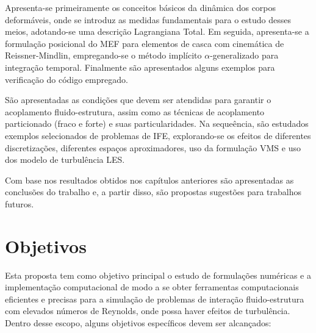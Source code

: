 {         Apresenta-se primeiramente os conceitos básicos da dinâmica dos corpos deformáveis, onde se introduz as medidas fundamentais para o estudo desses meios, adotando-se uma descrição Lagrangiana Total. Em seguida, apresenta-se a formulação posicional do MEF para elementos de casca com cinemática de Reissner-Mindlin, empregando-se o método implícito $\alpha$-generalizado para integração temporal. Finalmente são apresentados alguns exemplos para verificação do código empregado.


         São apresentadas as condições que devem ser atendidas para garantir o acoplamento fluido-estrutura, assim como as técnicas de acoplamento particionado (fraco e forte) e suas particularidades. Na sequeência, são estudados exemplos selecionados de problemas de IFE, explorando-se os efeitos de diferentes discretizações, diferentes espaços aproximadores, uso da formulação VMS e uso dos modelo de turbulência LES.

         Com base nos resultados obtidos nos capítulos anteriores são apresentadas as conclusões do trabalho e, a partir disso, são propostas sugestões para trabalhos futuros.
    }




\section{Objetivos}

Esta proposta tem como objetivo principal o estudo de formulações numéricas e a implementação computacional de modo a se obter ferramentas computacionais eficientes e precisas para a simulação de problemas de interação fluido-estrutura com elevados números de Reynolds, onde possa haver efeitos de turbulência. Dentro desse escopo, alguns objetivos específicos devem ser alcançados:

